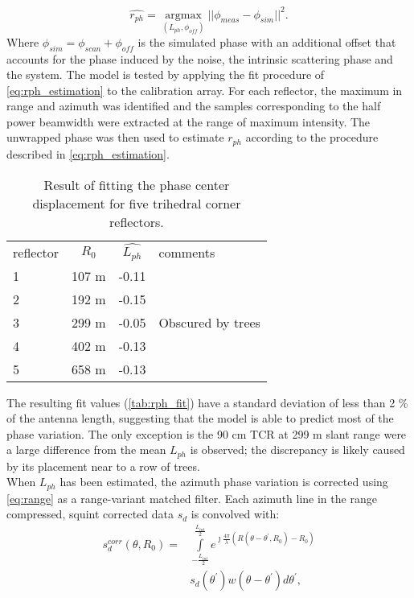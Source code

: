 \begin{equation}\label{eq:rph_estimation}
	\hat{r_{ph}} = \underset{\left(L_{ph}, \phi_{off}\right)}{\operatorname{argmax}}{\vert\vert\phi_{meas} - \phi_{sim}\vert\vert}^2.
\end{equation}
Where $\phi_{sim} = \phi_{scan} + \phi_{off}$ is the simulated phase with an additional offset that accounts for the phase induced by the noise, the intrinsic scattering phase and the system.
The model is tested by applying the fit procedure of \autoref{eq:rph_estimation} to the calibration array. For each reflector, the maximum in range and azimuth was identified and the samples corresponding to the half power beamwidth were extracted at the range of maximum intensity. The unwrapped phase was then used to estimate $r_{ph}$ according to the procedure described in \autoref{eq:rph_estimation}.
\begin{table}[ht]
	\begin{tabular}{lccl}
		\hline
		reflector & $R_0$ & $\hat{L_{ph}}$ & comments\\
		1	& 107 m & -0.11 & \\
		2  & 192 m & -0.15 & \\
		3 & 299 m & -0.05 & Obscured by trees\\
		4 & 402 m & -0.13 &\\
		5 & 658 m & -0.13&\\
		\hline
	\end{tabular}
	\caption{Result of fitting the phase center displacement for five trihedral corner reflectors.}
	\label{tab:rph_fit}
\end{table}
The resulting fit values (\autoref{tab:rph_fit}) have a standard deviation of less than 2 \% of the antenna length, suggesting that the model is able to predict  most of the phase variation. The only exception is the 90 cm TCR at 299 m slant range were a large difference from the mean $L_{ph}$ is observed; the discrepancy is likely caused by its placement near to a row of trees.\\
When $L_{ph}$ has been estimated, the azimuth phase variation is corrected using \autoref{eq:range} as a range-variant matched filter. Each azimuth line in the range compressed, squint corrected data $s_{d}$ is convolved with:
\begin{equation}\label{eq:correction}
	\begin{aligned}
		s_{d}^{corr}\left(\theta, R_{0}\right) = &\int\limits_{-\frac{L_{int}}{2}}^{\frac{L_{int}}{2}}e^{\jmath \frac{4\pi}{\lambda}\left(R\left(\theta - \theta^{\prime}, R_{0}\right) - R_{0}\right)}\\
		&s_{d}\left(\theta^\prime\right)w(\theta - \theta^{\prime}) d\theta^\prime,
	\end{aligned}
\end{equation}
